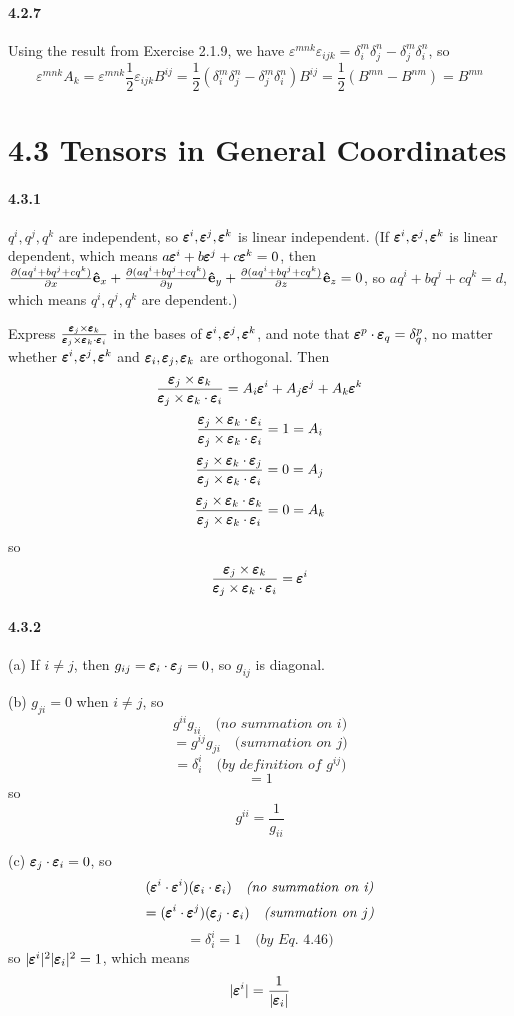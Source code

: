 \documentclass[a4paper]{article}
\begin{document}
\paragraph{4.2.7}
Using the result from Exercise 2.1.9, we have $\varepsilon^{mnk}\varepsilon_{ijk}=\delta^m_i\delta^n_j-\delta^m_j\delta^n_i$, so
\[
\varepsilon^{mnk}A_k
=\varepsilon^{mnk}\frac{1}{2}\varepsilon_{ijk}B^{ij}
=\frac{1}{2}(\delta^m_i\delta^n_j-\delta^m_j\delta^n_i)B^{ij}=\frac{1}{2}(B^{mn}-B^{nm})=B^{mn}
\]

\section*{4.3 Tensors in General Coordinates}

\paragraph{4.3.1}
$q^i,q^j,q^k$ are independent, so $\EE^i,\EE^j,\EE^k$ is linear independent. (If $\EE^i,\EE^j,\EE^k$ is linear dependent, which means $a\EE^i+b\EE^j+c\EE^k=0$, then $\pdv{(aq^i+bq^j+cq^k)}{x}\VE_x+\pdv{(aq^i+bq^j+cq^k)}{y}\VE_y+\pdv{(aq^i+bq^j+cq^k)}{z}\VE_z=0$, so $aq^i+bq^j+cq^k=d$, which means $q^i,q^j,q^k$ are dependent.)

Express $\frac{\EE_j\times\EE_k}{\EE_j\times\EE_k\cdot\EE_i}$ in the bases of $\EE^i,\EE^j,\EE^k$, and note that $\EE^p\cdot\EE_q=\delta^p_q$, no matter whether $\EE^i,\EE^j,\EE^k$ and $\EE_i,\EE_j,\EE_k$ are orthogonal. Then
\[
\frac{\EE_j\times\EE_k}{\EE_j\times\EE_k\cdot\EE_i}=A_i\EE^i+A_j\EE^j+A_k\EE^k
\]
\[
\frac{\EE_j\times\EE_k\cdot\EE_i}{\EE_j\times\EE_k\cdot\EE_i}=1=A_i
\]
\[
\frac{\EE_j\times\EE_k\cdot\EE_j}{\EE_j\times\EE_k\cdot\EE_i}=0=A_j
\]
\[
\frac{\EE_j\times\EE_k\cdot\EE_k}{\EE_j\times\EE_k\cdot\EE_i}=0=A_k
\]
so
\[
\frac{\EE_j\times\EE_k}{\EE_j\times\EE_k\cdot\EE_i}=\EE^i
\]

\paragraph{4.3.2}
(a) If $i\neq j$, then $g_{ij}=\EE_i\cdot\EE_j=0$, so $g_{ij}$ is diagonal.

(b)
$g_{ji}=0$ when $i\neq j$, so
\[
g^{ii}g_{ii}\quad\textit{(no summation on i)}
\]
\[
=g^{ij}g_{ji}\quad\textit{(summation on $j$)}
\]
\[
=\delta^i_i\quad\textit{(by definition of $g^{ij}$)}
\]
\[
=1
\]
so 
\[
g^{ii}=\frac{1}{g_{ii}}
\]

(c) $\EE_j\cdot\EE_i=0$, so 
\[
(\EE^i\cdot\EE^i)(\EE_i\cdot\EE_i)\quad\textit{(no summation on i)}
\]
\[
=(\EE^i\cdot\EE^j)(\EE_j\cdot\EE_i)\quad\textit{(summation on $j$)}
\]
\[
=\delta^i_i=1\quad\textit{(by Eq. $4.46$)}
\]
so $|\EE^i|^2|\EE_i|^2=1$, which means
\[
|\EE^i|=\frac{1}{|\EE_i|}
\]
\end{document}

